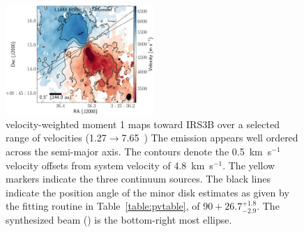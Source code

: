



\begin{figure}[H]
\begin{center}
   \includegraphics[width=0.5\textwidth]{img/L1448IRS3B_C17O_image_taper1500k_image_M1_fits.pdf}  %
\end{center}
   \caption{\cso\space velocity-weighted moment 1 maps toward IRS3B over a selected range of velocities (1.27$\rightarrow$7.65~\kms) The \cso\space emission appears well ordered across the semi-major axis. The contours denote the 0.5~km~s$^{-1}$ velocity offsets from system velocity of 4.8~km~s$^{-1}$. The yellow markers indicate the three continuum sources. The black lines indicate the position angle of the minor disk estimates as given by the \pdspy\space fitting routine in Table~\ref{table:pvtable}, of $90+26.7^{+  1.8}_{-  2.9}$\deg. The \cso\space synthesized beam (\csobeam) is the bottom-right most ellipse.}\label{fig:irs3abc17omoment1}
\end{figure}





